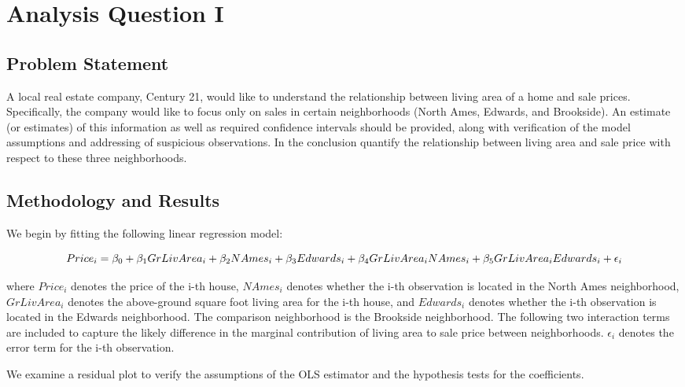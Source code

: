 \documentclass[american,]{article}
\begin{document}
\section{Analysis Question I}\label{analysis-question-i}

\subsection{Problem Statement}\label{problem-statement}

A local real estate company, Century 21, would like to understand the
relationship between living area of a home and sale prices.
Specifically, the company would like to focus only on sales in certain
neighborhoods (North Ames, Edwards, and Brookside). An estimate (or
estimates) of this information as well as required confidence intervals
should be provided, along with verification of the model assumptions and
addressing of suspicious observations. In the conclusion quantify the
relationship between living area and sale price with respect to these
three neighborhoods.

\subsection{Methodology and Results}\label{methodology-and-results}

We begin by fitting the following linear regression model:

\begin{equation}
Price_i = {\beta_0} + {\beta_1}GrLivArea_{i} + {\beta_2}NAmes_{i} + {\beta_3}Edwards_{i} + {\beta_4}GrLivArea_{i}\*NAmes_{i}
+ {\beta_5}GrLivArea_{i}\*Edwards_{i}
+ {\epsilon_i}
\end{equation}

where \(Price_i\) denotes the price of the i-th house, \(NAmes_i\)
denotes whether the i-th observation is located in the North Ames
neighborhood, \(GrLivArea_i\) denotes the above-ground square foot
living area for the i-th house, and \(Edwards_i\) denotes whether the
i-th observation is located in the Edwards neighborhood. The comparison
neighborhood is the Brookside neighborhood. The following two
interaction terms are included to capture the likely difference in the
marginal contribution of living area to sale price between
neighborhoods. \(\epsilon_i\) denotes the error term for the i-th
observation.

We examine a residual plot to verify the assumptions of the OLS
estimator and the hypothesis tests for the coefficients.
\end{document}
